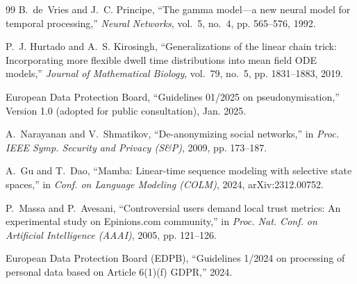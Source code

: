 \documentclass[lettersize,journal]{IEEEtran}
\begin{document}
\begin{thebibliography}{99}
B.~de~Vries and J.~C. Principe, ``The gamma model---a new neural model for
  temporal processing,'' \emph{Neural Networks}, vol.~5, no.~4, pp. 565--576,
  1992.

P.~J. Hurtado and A.~S. Kirosingh, ``Generalizations of the linear chain
  trick: Incorporating more flexible dwell time distributions into mean field
  {ODE} models,'' \emph{Journal of Mathematical Biology}, vol.~79, no.~5, pp.
  1831--1883, 2019.

European Data Protection Board, ``Guidelines 01/2025 on pseudonymisation,'' Version 1.0 (adopted for public consultation), Jan. 2025.

A.~Narayanan and V.~Shmatikov, ``De-anonymizing social networks,'' in \emph{Proc. IEEE Symp. Security and Privacy (S\&P)}, 2009, pp. 173--187.

A.~Gu and T.~Dao, ``{Mamba}: Linear-time sequence modeling with selective state
  spaces,'' in \emph{Conf. on Language Modeling (COLM)}, 2024,
  arXiv:2312.00752.

P.~Massa and P.~Avesani, ``Controversial users demand local trust metrics: An
  experimental study on {Epinions.com} community,'' in \emph{Proc. Nat. Conf. on Artificial Intelligence (AAAI)}, 2005, pp. 121--126.

{European Data Protection Board (EDPB)}, ``Guidelines 1/2024 on processing of
  personal data based on Article 6(1)(f) {GDPR},'' 2024.

\end{thebibliography}
\end{document}
